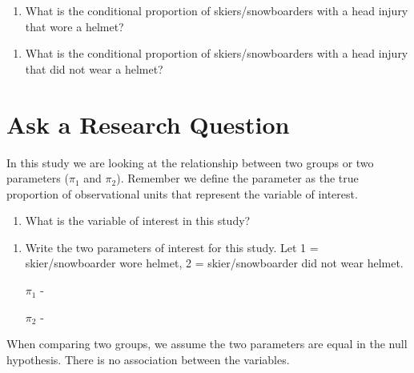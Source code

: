 \documentclass[
]{report}
\providecommand{\tightlist}{%
  \setlength{\itemsep}{0pt}\setlength{\parskip}{0pt}}
\begin{document}
\begin{enumerate}
\def\labelenumi{\arabic{enumi}.}
\setcounter{enumi}{4}
\tightlist
\item
  What is the conditional proportion of skiers/snowboarders with a head injury that wore a helmet?
\end{enumerate}

\vspace{1in}

\begin{enumerate}
\def\labelenumi{\arabic{enumi}.}
\setcounter{enumi}{5}
\tightlist
\item
  What is the conditional proportion of skiers/snowboarders with a head injury that did not wear a helmet?
\end{enumerate}

\vspace{1in}

\hypertarget{ask-a-research-question}{%
\section{Ask a Research Question}\label{ask-a-research-question}}

In this study we are looking at the relationship between two groups or two parameters (\(\pi_1\) and \(\pi_2\)). Remember we define the parameter as the true proportion of observational units that represent the variable of interest.

\begin{enumerate}
\def\labelenumi{\arabic{enumi}.}
\setcounter{enumi}{6}
\tightlist
\item
  What is the variable of interest in this study?
\end{enumerate}

\vspace{0.5in}

\begin{enumerate}
\def\labelenumi{\arabic{enumi}.}
\setcounter{enumi}{7}
\item
  Write the two parameters of interest for this study. Let 1 = skier/snowboarder wore helmet, 2 = skier/snowboarder did not wear helmet.

  \(\pi_1\) -
  \vspace{0.5in}

  \(\pi_2\) -
  \vspace{0.5in}
\end{enumerate}

When comparing two groups, we assume the two parameters are equal in the null hypothesis. There is no association between the variables.
\end{document}
